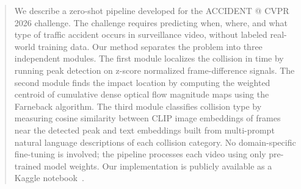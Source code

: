 \begin{abstract}
We describe a zero-shot pipeline developed for the ACCIDENT @ CVPR 2026 challenge.
The challenge requires predicting when, where, and what type of traffic accident occurs in surveillance video, without labeled real-world training data.
Our method separates the problem into three independent modules.
The first module localizes the collision in time by running peak detection on z-score normalized frame-difference signals.
The second module finds the impact location by computing the weighted centroid of cumulative dense optical flow magnitude maps using the Farneback algorithm.
The third module classifies collision type by measuring cosine similarity between CLIP image embeddings of frames near the detected peak and text embeddings built from multi-prompt natural language descriptions of each collision category.
No domain-specific fine-tuning is involved; the pipeline processes each video using only pre-trained model weights.
Our implementation is publicly available as a Kaggle notebook~\cite{thakur2026notebook}.
\end{abstract}
